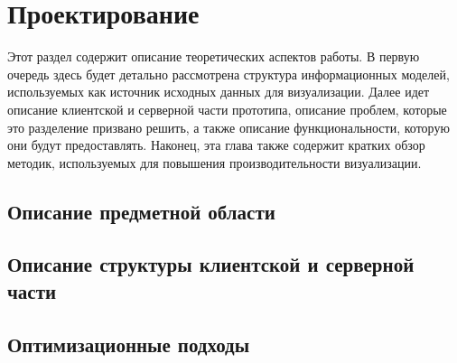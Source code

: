 ﻿\section{Проектирование}

Этот раздел содержит описание теоретических аспектов работы.
В первую очередь здесь будет детально рассмотрена
структура информационных моделей,
используемых как источник исходных данных для визуализации.
Далее идет описание клиентской и серверной части прототипа,
описание проблем, которые это разделение призвано решить,
а также описание функциональности, которую они будут предоставлять.
Наконец, эта глава также содержит кратких обзор методик,
используемых для повышения производительности визуализации.

\subsection{Описание предметной области}
\lipsum[4]

\subsection{Описание структуры клиентской и серверной части}
\lipsum[5]

\subsection{Оптимизационные подходы}
\lipsum[6]
